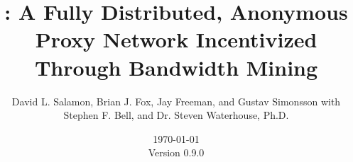 %
%


\title{\Orchid: A Fully Distributed, Anonymous Proxy Network Incentivized Through Bandwidth Mining}

\ifdefined\isdraft
  
\fi

%
%
\author{{David L. Salamon, Brian J. Fox, Jay Freeman, and Gustav Simonsson with} \\ 
		{{Stephen F. Bell, and Dr. Steven Waterhouse, Ph.D.}}}

%
%
\date{\today{} \\ Version 0.9.0}